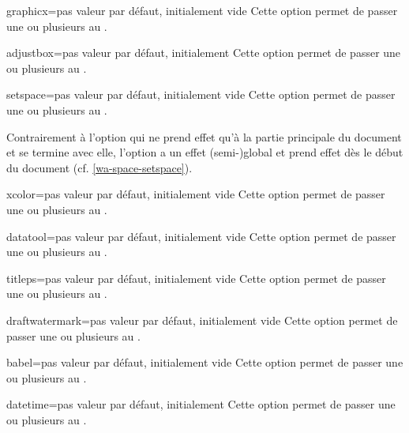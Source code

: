 \begin{docKey}{graphicx}{=}{pas valeur par défaut,
    initialement vide}
  Cette option permet de passer une ou plusieurs  au
  .
\end{docKey}
\begin{docKey}{adjustbox}{=}{pas valeur par défaut,
    initialement }
  Cette option permet de passer une ou plusieurs  au
  .
\end{docKey}
\begin{docKey}{setspace}{=}{pas valeur par défaut,
    initialement vide}
  Cette option permet de passer une ou plusieurs  au
  .

  Contrairement à l'option  qui ne prend effet qu'à la partie
  principale du document et se termine avec elle, l'option 
  a un effet (semi-)global et prend effet dès le début du document
  (cf. \vref{wa-space-setspace}).
\end{docKey}
\begin{docKey}{xcolor}{=}{pas valeur par défaut,
    initialement vide}
  Cette option permet de passer une ou plusieurs  au
  .
\end{docKey}
\begin{docKey}{datatool}{=}{pas valeur par défaut,
    initialement vide}
  Cette option permet de passer une ou plusieurs  au
  .
\end{docKey}
\begin{docKey}{titleps}{=}{pas valeur par défaut, initialement
    vide}
  Cette option permet de passer une ou plusieurs  au
  .
\end{docKey}
\begin{docKey}{draftwatermark}{=}{pas valeur par défaut,
    initialement vide}
  Cette option permet de passer une ou plusieurs  au
  .
\end{docKey}
\begin{docKey}{babel}{=}{pas valeur par défaut,
    initialement vide}
  Cette option permet de passer une ou plusieurs  au
  .
\end{docKey}
\begin{docKey}{datetime}{=}{pas valeur par défaut,
    initialement }
  Cette option permet de passer une ou plusieurs  au
  .
\end{docKey}
%


